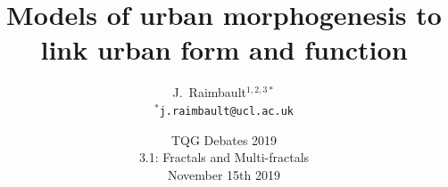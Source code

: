 



\title[Models of urban morphogenesis]{Models of urban morphogenesis to link urban form and function}
\author[J. Raimbault]{J.~Raimbault$^{1,2,3\ast}$\\\medskip
$^{\ast}$\texttt{j.raimbault@ucl.ac.uk}
}





\date[15th November 2019]{TQG Debates 2019\\
3.1: Fractals and Multi-fractals\\
November 15th 2019
}

\frame{\maketitle}





